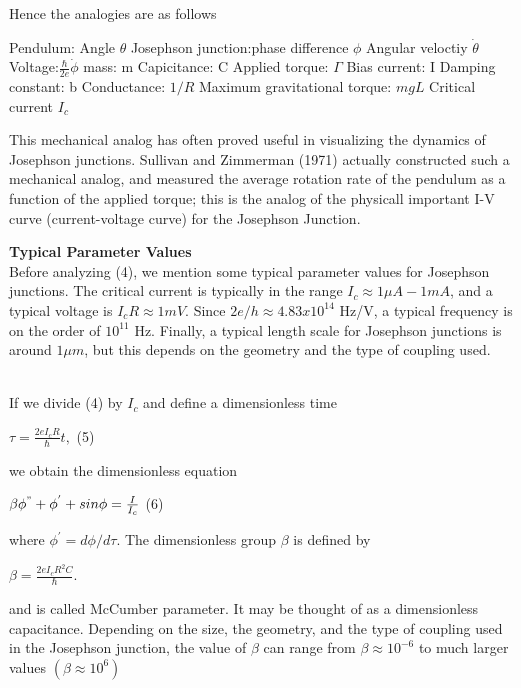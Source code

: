 \documentclass{article}
\newcommand\tab[1][1cm]{\hspace*{#1}}
\begin{document}
Hence the analogies are as follows
\begin{center}
Pendulum: Angle $\theta$ \tab Josephson junction:phase difference $\phi$ \tab Angular veloctiy $\dot{\theta}$ \tab Voltage:$\frac{\hbar}{2e}\dot{\phi}$ \tab mass: m \tab Capicitance: C \tab Applied torque: $\Gamma$ \tab Bias current: I \tab Damping constant: b \tab Conductance: $1/R$ \tab Maximum gravitational torque: $mgL$ \tab Critical current $I_{c}$
\end{center}

This mechanical analog has often proved useful in visualizing the dynamics of Josephson junctions. Sullivan and Zimmerman (1971) actually constructed such a mechanical analog, and measured the average rotation rate of the pendulum as a function of the applied torque; this is the analog of the physicall important I-V curve (current-voltage curve) for the Josephson Junction.

\textbf {Typical Parameter Values} \\ \tab
Before analyzing (4), we mention some typical parameter values for Josephson junctions. The critical current is typically in the range $I_{c} \approx 1 \mu A - 1 m A$, and a typical voltage is $I_{c}R \approx 1 mV$. Since $2e/h \approx 4.83 x 10^{14}$ Hz/V, a typical frequency is on the order of $10^{11}$ Hz. Finally, a typical length scale for Josephson junctions is around $1 \mu m$, but this depends on the geometry and the type of coupling used. 

\\ \tab If we divide (4) by $I_{c}$ and define a dimensionless time
\begin{center}
$\tau = \frac{2eI_{c}R}{\hbar} t,$ \tab (5)
\end{center}

we obtain the dimensionless equation
\begin{center}
$\beta \phi^{"} + \phi^{'} + sin \phi = \frac{I}{I_{c}}$ \tab (6)
\end{center}

where $\phi^{'}=d\phi/d\tau$. The dimensionless group $\beta$ is defined by

\begin{center}
$\beta = \frac{2e I_{c} R^{2}C}{\hbar}$.
\end{center}

and is called McCumber parameter. It may be thought of as a dimensionless capacitance. Depending on the size, the geometry, and the type of coupling used in the Josephson junction, the value of $\beta$ can range from $\beta \approx {10^{-6}}$ to much larger values $(\beta \approx 10^{6})$ \\ \tab
\end{document}
